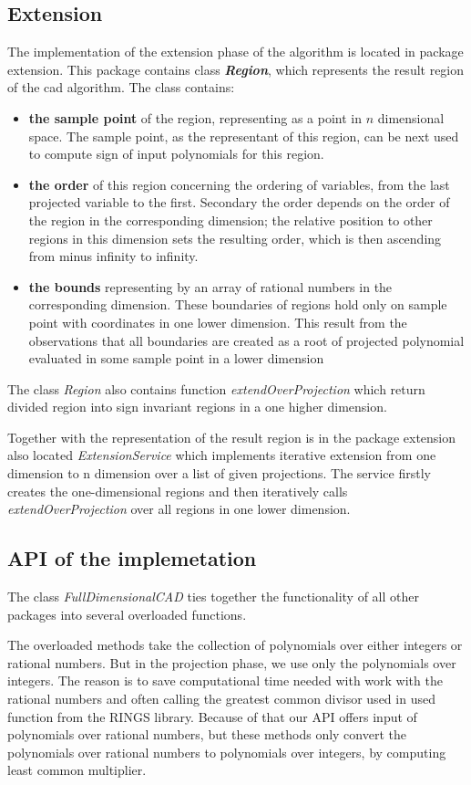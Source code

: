 \documentclass[
  digital, %
  twoside, %
  table,   %
  nolof,     %
  nolot,     %
]{fithesis3}
\begin{document}
\subsection{Extension}
The implementation of the extension phase of the algorithm is located in package extension. This package contains class \textbf{\textit{Region}}, which represents the result region of the cad algorithm. The class contains:
\begin{itemize} 
  \item \textbf{the sample point} of the region, representing as a point in $n$ dimensional space. The sample point, as the representant of this region, can be next used to compute sign of input polynomials for this region.
  \item \textbf{the order} of this region concerning the ordering of variables, from the last projected variable to the first. Secondary the order depends on the order of the region in the corresponding dimension; the relative position to other regions in this dimension sets the resulting order, which is then ascending from minus infinity to infinity.
  \item \textbf{the bounds} representing by an array of rational numbers in the corresponding dimension. These boundaries of regions hold only on sample point with coordinates in one lower dimension. This result from the observations that all boundaries are created as a root of projected polynomial evaluated in some sample point in a lower dimension
\end{itemize}
The class \textit{Region} also contains function \textit{extendOverProjection} which return divided region into sign invariant regions in a one higher dimension.

Together with the representation of the result region is in the package extension also located \textit{ExtensionService} which implements iterative extension from one dimension to n dimension over a list of given projections. The service firstly creates the one-dimensional regions and then iteratively calls \textit{extendOverProjection} over all regions in one lower dimension.


\subsection{API of the implemetation}
The class \textit{FullDimensionalCAD} ties together the functionality of all other packages into several overloaded functions.

The overloaded methods take the collection of polynomials over either integers or rational numbers. But in the projection phase, we use only the polynomials over integers. The reason is to save computational time needed with work with the rational numbers and often calling the greatest common divisor used in used function from the RINGS library.
Because of that our API offers input of polynomials over rational numbers, but these methods only convert the polynomials over rational numbers to polynomials over integers, by computing least common multiplier.
\end{document}
